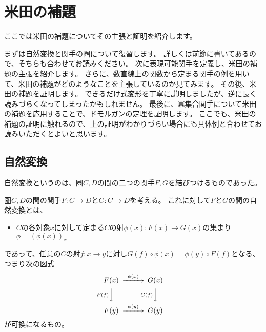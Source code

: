 \documentclass[uplatex]{jsarticle}
\begin{document}
\section{米田の補題}
ここでは米田の補題についてその主張と証明を紹介します。

まずは自然変換と関手の圏について復習します。
詳しくは前節に書いてあるので、そちらも合わせてお読みください。
次に表現可能関手を定義し、米田の補題の主張を紹介します。
さらに、数直線上の関数から定まる関手の例を用いて、米田の補題がどのようなことを主張しているのか見てみます。
その後、米田の補題を証明します。
できるだけ式変形を丁寧に説明しましたが、逆に長く読みづらくなってしまったかもしれません。
最後に、冪集合関手について米田の補題を応用することで、ドモルガンの定理を証明します。
ここでも、米田の補題の証明に触れるので、上の証明がわかりづらい場合にも具体例と合わせてお読みいただくとよいと思います。

\subsection{自然変換}
自然変換というのは、圏$C, D$の間の二つの関手$F, G$を結びつけるものであった。

\begin{dfn}
圏$C, D$の間の関手$F:C \to D$と$G:C \to D$を考える。
これに対して$F$と$G$の間の自然変換とは、
\begin{itemize}
\item $C$の各対象$x$に対して定まる$C$の射$\phi(x):F(x)\to G(x)$の集まり$\phi=(\phi(x))_x$
\end{itemize}
であって、任意の$C$の射$f:x\to y$に対し$G(f)\circ\phi(x)=\phi(y)\circ F(f)$となる、つまり次の図式
\[
\begin{CD}
F(x)@>\phi(x)>>G(x)\\
@VF(f)VV@VG(f)VV\\
F(y)@>\phi(y)>>G(y)
\end{CD}
\]
が可換になるもの。
\end{dfn}
\end{document}
